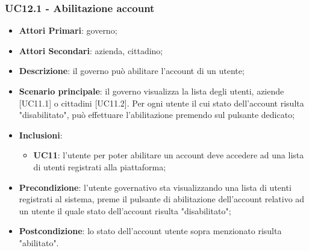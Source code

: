 \subsubsection{UC12.1 - Abilitazione account}
\begin{itemize}
	\item \textbf{Attori Primari}:
	governo;
	\item \textbf{Attori Secondari}:
	azienda, cittadino;
	\item \textbf{Descrizione}: il governo può abilitare l'account di un utente;
	\item \textbf{Scenario principale}: il governo visualizza la lista degli utenti, aziende [UC11.1] o cittadini [UC11.2]. Per ogni utente il cui stato dell'account risulta "disabilitato", può effettuare l'abilitazione premendo sul pulsante dedicato;
	\item \textbf{Inclusioni}: 
	\begin{itemize}
		\item \textbf{UC11}: l'utente per poter abilitare un account deve accedere ad una lista di utenti registrati alla piattaforma;
	\end{itemize}
	\item \textbf{Precondizione}: l'utente governativo sta visualizzando una lista di utenti registrati al sistema, preme il pulsante di abilitazione dell'account relativo ad un utente il quale stato dell'account risulta "disabilitato";
	\item \textbf{Postcondizione}: lo stato  dell'account utente sopra menzionato risulta "abilitato".
\end{itemize} 


